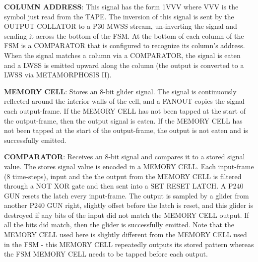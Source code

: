\documentclass{article}
\begin{document}
\vspace{1em}

\noindent\textbf{COLUMN ADDRESS}: This signal has the form 1VVV where VVV is the symbol just read from the TAPE. The inversion of this signal is sent by the OUTPUT COLLATOR to a P30 MWSS stream, un-inverting the signal and sending it across the bottom of the FSM. At the bottom of each column of the FSM is a COMPARATOR that is configured to recognize its column's address. When the signal matches a column via a COMPARATOR, the signal is eaten and a LWSS is emitted upward along the column (the output is converted to a LWSS via METAMORPHOSIS II).

\vspace{1em}

\noindent\textbf{MEMORY CELL}: Stores an 8-bit glider signal. The signal is continuously reflected around the interior walls of the cell, and a FANOUT copies the signal each output-frame. If the MEMORY CELL has not been tapped at the start of the output-frame, then the output signal is eaten. If the MEMORY CELL has not been tapped at the start of the output-frame, the output is not eaten and is successfully emitted.

\vspace{1em}

\noindent\textbf{COMPARATOR}: Receives an 8-bit signal and compares it to a stored signal value. The stores signal value is encoded in a MEMORY CELL. Each input-frame (8 time-steps), input and the the output from the MEMORY CELL is filtered through a NOT XOR gate and then sent into a SET RESET LATCH. A P240 GUN resets the latch every input-frame. The output is sampled by a glider from another P240 GUN right, slightly offset before the latch is reset, and this glider is destroyed if any bits of the input did not match the MEMORY CELL output. If all the bits did match, then the glider is successfully emitted. Note that the MEMORY CELL used here is slightly different from the MEMORY CELL used in the FSM - this MEMORY CELL repeatedly outputs its stored pattern whereas the FSM MEMORY CELL needs to be tapped before each output.

\vspace{1em}
\end{document}
